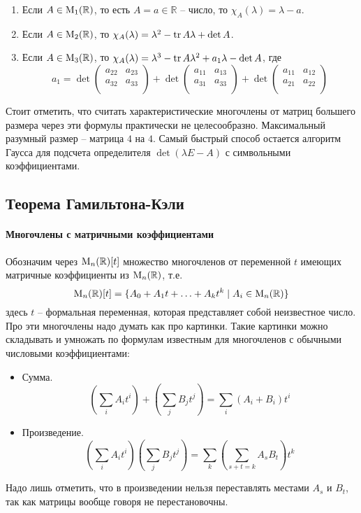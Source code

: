 \begin{enumerate}
\item Если $A\in\operatorname{M}_{1}(\mathbb R)$, то есть $A = a\in\mathbb R$ -- число, то $\chi_A(\lambda) = \lambda - a$.

\item Если $A\in\operatorname{M}_{2}(\mathbb R)$, то $\chi_A(\lambda) = \lambda^2 - \operatorname{tr} A \lambda + \det A$.

\item Если $A\in\operatorname{M}_{3}(\mathbb R)$, то $\chi_A(\lambda) = \lambda^3 - \operatorname{tr} A \lambda^2 + a_1 \lambda - \det A$, где
\[
a_1 = 
\det
\begin{pmatrix}
{a_{22}}&{a_{23}}\\
{a_{32}}&{a_{33}}\\
\end{pmatrix}
+
\det
\begin{pmatrix}
{a_{11}}&{a_{13}}\\
{a_{31}}&{a_{33}}\\
\end{pmatrix}
+
\det
\begin{pmatrix}
{a_{11}}&{a_{12}}\\
{a_{21}}&{a_{22}}\\
\end{pmatrix}
\]
\end{enumerate}

Стоит отметить, что считать характеристические многочлены от матриц большего размера через эти формулы практически не целесообразно.
Максимальный разумный размер -- матрица $4$ на $4$.
Самый быстрый способ остается алгоритм Гаусса для подсчета определителя $\det(\lambda E - A)$ с символьными коэффициентами.

\subsection{Теорема Гамильтона-Кэли}

\paragraph{Многочлены с матричными коэффициентами}

Обозначим через $\operatorname{M}_{n}(\mathbb R)[t]$ множество многочленов от переменной $t$ имеющих матричные коэффициенты из $\operatorname{M}_{n}(\mathbb R)$, т.е.
\[
\operatorname{M}_{n}(\mathbb R)[t] = \{A_0+A_1t+\ldots + A_k t^k\mid A_i\in \operatorname{M}_{n}(\mathbb R)\}
\]
здесь $t$ -- формальная переменная, которая представляет собой неизвестное число.
Про эти многочлены надо думать как про картинки.
Такие картинки можно складывать и умножать по формулам известным для многочленов с обычными числовыми коэффициентами:
\begin{itemize}
\item Сумма.
\[
\left(\sum_{i}A_i t^i\right) +\left (\sum_{j}B_j t^j\right) = \sum_{i}(A_i+ B_i) t^i
\]

\item Произведение.
\[
\left(\sum_i A_i t^i\right)\left( \sum_j B_j t^j\right) = \sum_k \left(\sum_{s+t = k}A_s B_t\right)t^k
\]
\end{itemize}
Надо лишь отметить, что в произведении нельзя переставлять местами $A_s$ и $B_t$, так как матрицы вообще говоря не перестановочны.

